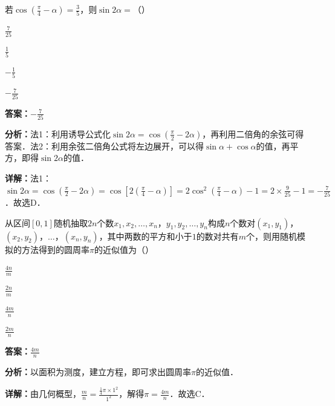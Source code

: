 \begin{question}[points=5]
若$\cos\left(\frac{\pi}{4}-\alpha\right)=\frac{3}{5}$，则$\sin2\alpha=$（\quad）
\begin{choices}
  \item $\frac{7}{25}$
  \item $\frac{1}{5}$
  \item $-\frac{1}{5}$
  \item $-\frac{7}{25}$
\end{choices}
\begin{solution}
\textbf{答案：}$-\frac{7}{25}$

\textbf{分析：}法1：利用诱导公式化$\sin2\alpha=\cos\left(\frac{\pi}{2}-2\alpha\right)$，再利用二倍角的余弦可得答案．法2：利用余弦二倍角公式将左边展开，可以得$\sin\alpha+\cos\alpha$的值，再平方，即得$\sin2\alpha$的值．

\textbf{详解：}法1：$\sin2\alpha=\cos\left(\frac{\pi}{2}-2\alpha\right)=\cos\left[2\left(\frac{\pi}{4}-\alpha\right)\right]=2\cos^2\left(\frac{\pi}{4}-\alpha\right)-1=2\times\frac{9}{25}-1=-\frac{7}{25}$．故选D．
\end{solution}
\end{question}

\begin{question}[points=5]
从区间$[0,1]$随机抽取$2n$个数$x_1,x_2,\ldots,x_n$，$y_1,y_2,\ldots,y_n$构成$n$个数对$(x_1,y_1)$，$(x_2,y_2)$，$\ldots$，$(x_n,y_n)$，其中两数的平方和小于$1$的数对共有$m$个，则用随机模拟的方法得到的圆周率$\pi$的近似值为（\quad）
\begin{choices}
  \item $\frac{4n}{m}$
  \item $\frac{2n}{m}$
  \item $\frac{4m}{n}$
  \item $\frac{2m}{n}$
\end{choices}
\begin{solution}
\textbf{答案：}$\frac{4m}{n}$

\textbf{分析：}以面积为测度，建立方程，即可求出圆周率$\pi$的近似值．

\textbf{详解：}由几何概型，$\frac{m}{n}=\frac{\frac{1}{4}\pi\times1^2}{1^2}$，解得$\pi=\frac{4m}{n}$．故选C．
\end{solution}
\end{question}

